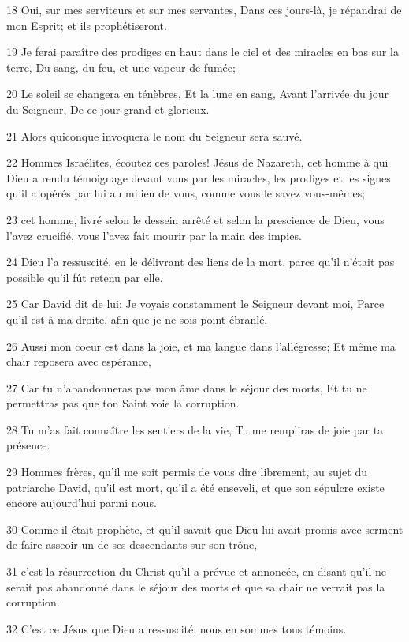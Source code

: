 \par 18 Oui, sur mes serviteurs et sur mes servantes, Dans ces jours-là, je répandrai de mon Esprit; et ils prophétiseront.
\par 19 Je ferai paraître des prodiges en haut dans le ciel et des miracles en bas sur la terre, Du sang, du feu, et une vapeur de fumée;
\par 20 Le soleil se changera en ténèbres, Et la lune en sang, Avant l'arrivée du jour du Seigneur, De ce jour grand et glorieux.
\par 21 Alors quiconque invoquera le nom du Seigneur sera sauvé.
\par 22 Hommes Israélites, écoutez ces paroles! Jésus de Nazareth, cet homme à qui Dieu a rendu témoignage devant vous par les miracles, les prodiges et les signes qu'il a opérés par lui au milieu de vous, comme vous le savez vous-mêmes;
\par 23 cet homme, livré selon le dessein arrêté et selon la prescience de Dieu, vous l'avez crucifié, vous l'avez fait mourir par la main des impies.
\par 24 Dieu l'a ressuscité, en le délivrant des liens de la mort, parce qu'il n'était pas possible qu'il fût retenu par elle.
\par 25 Car David dit de lui: Je voyais constamment le Seigneur devant moi, Parce qu'il est à ma droite, afin que je ne sois point ébranlé.
\par 26 Aussi mon coeur est dans la joie, et ma langue dans l'allégresse; Et même ma chair reposera avec espérance,
\par 27 Car tu n'abandonneras pas mon âme dans le séjour des morts, Et tu ne permettras pas que ton Saint voie la corruption.
\par 28 Tu m'as fait connaître les sentiers de la vie, Tu me rempliras de joie par ta présence.
\par 29 Hommes frères, qu'il me soit permis de vous dire librement, au sujet du patriarche David, qu'il est mort, qu'il a été enseveli, et que son sépulcre existe encore aujourd'hui parmi nous.
\par 30 Comme il était prophète, et qu'il savait que Dieu lui avait promis avec serment de faire asseoir un de ses descendants sur son trône,
\par 31 c'est la résurrection du Christ qu'il a prévue et annoncée, en disant qu'il ne serait pas abandonné dans le séjour des morts et que sa chair ne verrait pas la corruption.
\par 32 C'est ce Jésus que Dieu a ressuscité; nous en sommes tous témoins.
